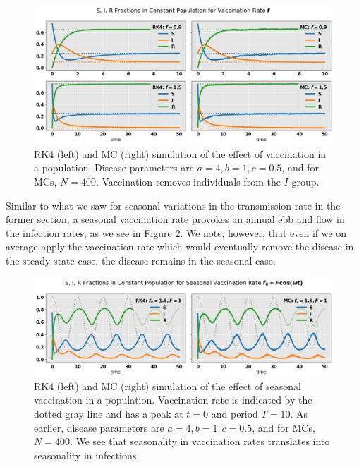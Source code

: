 \documentclass[]{article}
\begin{document}
\begin{figure}[!h]
	\centering
	\includegraphics[width=1\linewidth]{./figs/vaccination-rates.png}
	\caption{RK4 (left) and MC (right) simulation of the effect of vaccination in a population. Disease parameters are $a=4, b= 1, c=0.5$, and for MCs, $N=400$. Vaccination removes individuals from the $I$ group.}
	\label{fig:vaccination-rates}
\end{figure}

Similar to what we saw for seasonal variations in the transmission rate in the former section, a seasonal vaccination rate provokes an annual ebb and flow in the infection rates, as we see in Figure \ref{fig:seasonal-vaccination-rate}. We note, however, that even if we on average apply the vaccination rate which would eventually remove the disease in the steady-state case, the disease remains in the seasonal case. 

\begin{figure}[!h]
	\centering
	\includegraphics[width=1\linewidth]{./figs/seasonal-vaccination-rate.png}
	\caption{RK4 (left) and MC (right) simulation of the effect of seasonal vaccination in a population. Vaccination rate is indicated by the dotted gray line and has a peak at $t=0$ and period $T=10$. As earlier, disease parameters are $a=4, b= 1, c=0.5$, and for MCs, $N=400$. We see that seasonality in vaccination rates translates into seasonality in infections.}
	\label{fig:seasonal-vaccination-rate}
\end{figure}
\end{document}
